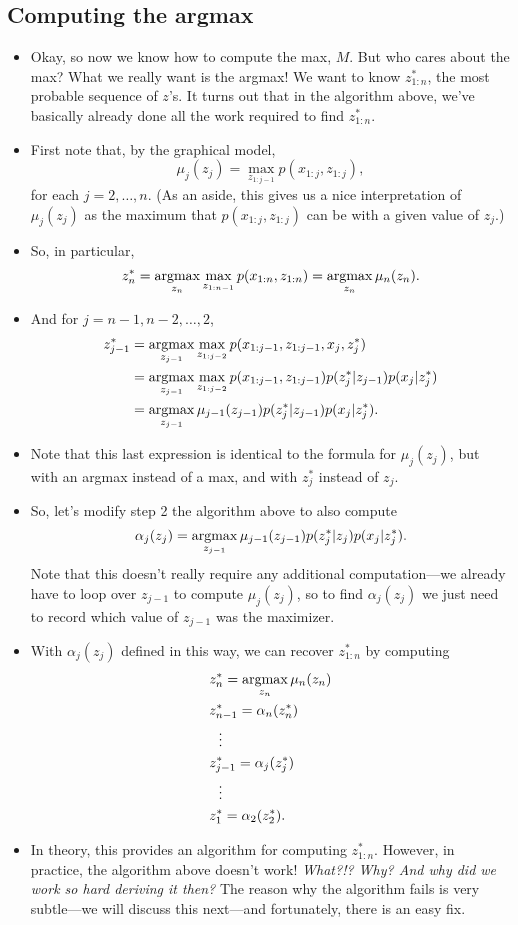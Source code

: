 \documentclass[12pt]{article}
\begin{document}
\subsection{Computing the argmax}
\begin{itemize}
\item Okay, so now we know how to compute the max, $M$. But who cares about the max? What we really want is the argmax! We want to know $z_{1:n}^*$, the most probable sequence of $z$'s. It turns out that in the algorithm above, we've basically already done all the work required to find $z_{1:n}^*$.
\item First note that, by the graphical model, 
$$ \mu_j(z_j) = \max_{z_{1:j-1}} p(x_{1:j},z_{1:j}), $$
for each $j = 2,\ldots,n$. (As an aside, this gives us a nice interpretation of $\mu_j(z_j)$ as the maximum that $p(x_{1:j},z_{1:j})$ can be with a given value of $z_j$.)
\item So, in particular,
$$ z_n^*= \operatorname*{argmax}_{z_n} \max_{z_{1:n-1}} p(x_{1:n},z_{1:n})
= \operatorname*{argmax}_{z_n} \mu_n(z_n). $$
\item And for $j = n-1,n-2,\ldots,2$,
\begin{align*}
z_{j-1}^* & = \operatorname*{argmax}_{z_{j-1}} \max_{z_{1:j-2}} p(x_{1:j -1},z_{1:j -1},x_j,z_j^*)\\
& = \operatorname*{argmax}_{z_{j-1}} \max_{z_{1:j-2}} p(x_{1:j -1},z_{1:j -1})p(z_j^*| z_{j-1})p(x_j|z_j^*)\\
& = \operatorname*{argmax}_{z_{j-1}} \mu_{j-1}(z_{j-1})p(z_j^*| z_{j-1})p(x_j|z_j^*).
\end{align*}
\item Note that this last expression is identical to the formula for $\mu_j(z_j)$, but with an argmax instead of a max, and with $z_j^*$ instead of $z_j$.
\item So, let's modify step 2 the algorithm above to also compute
$$ \alpha_j(z_j) = \operatorname*{argmax}_{z_{j-1}} \mu_{j-1}(z_{j-1}) p(z_j^*| z_j) p(x_j | z_j^*). $$
Note that this doesn't really require any additional computation---we already have to loop over $z_{j-1}$ to compute $\mu_j(z_j)$, so to find $\alpha_j(z_j)$ we just need to record which value of $z_{j-1}$ was the maximizer.
\item With $\alpha_j(z_j)$ defined in this way, we can recover $z_{1:n}^*$ by computing
\begin{align*}
&z_n^* = \operatorname*{argmax}_{z_n} \mu_n(z_n)\\
&z_{n-1}^* = \alpha_n(z_n^*)\\
&~~\vdots\\
&z_{j-1}^* = \alpha_j(z_j^*)\\
&~~\vdots\\
&z_1^* = \alpha_2(z_2^*).
\end{align*} 
\item In theory, this provides an algorithm for computing $z_{1:n}^*$. However, in practice, the algorithm above doesn't work! \textit{What?!? Why? And why did we work so hard deriving it then?} The reason why the algorithm fails is very subtle---we will discuss this next---and fortunately, there is an easy fix.
\end{itemize}
\end{document}
